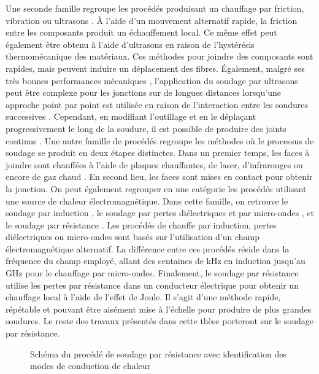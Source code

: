 \FloatBarrier
Une seconde famille regroupe les procédés produisant un chauffage par friction, vibration ou ultrasons \cite{Bates2007d}. 
À l'aide d'un mouvement alternatif rapide, la friction entre les composants produit un échauffement local. 
Ce même effet peut également être obtenu à l'aide d'ultrasons en raison de l'hystérésis thermomécanique des matériaux. 
Ces méthodes pour joindre des composants sont rapides, mais peuvent induire un déplacement des fibres. 
Également, malgré ses très bonnes performances mécaniques \cite{Villegas2016}, l'application du soudage par ultrasons peut être complexe pour les jonctions sur de longues distances lorsqu'une approche point par point est utilisée en raison de l'interaction entre les soudures successives \cite{Zhao2018}. 
Cependant, en modifiant l'outillage et en le déplaçant progressivement le long de la soudure, il est possible de produire des joints continus \cite{Engelschall2019}.
Une autre famille de procédés regroupe les méthodes où le processus de soudage se produit en deux étapes distinctes. 
Dans un premier temps, les faces à joindre sont chauffées à l'aide de plaques chauffantes, de laser, d'infrarouges ou encore de gaz chaud \cite{Yousefpour2004a,Johnson1989}. 
En second lieu, les faces sont mises en contact pour obtenir la jonction. 
On peut également regrouper en une catégorie les procédés utilisant une source de chaleur électromagnétique. 
Dans cette famille, on retrouve le soudage par induction \cite{Rudolf2000a,Ahmed2006a,Farahani2018}, le soudage  par pertes diélectriques et par micro-ondes \cite{Wu2012,Bowler2006a,Menendez2010d}, et le soudage par résistance \cite{houghton1984bonding,Eveno1988,Taylor1991,McKnight1997}. 
Les procédés de chauffe par induction, pertes diélectriques ou micro-ondes sont basés sur l'utilisation d'un champ électromagnétique alternatif. 
La différence entre ces procédés réside dans la fréquence du champ employé, allant des centaines de \si{\kilo\hertz} en induction jusqu'au \si{\giga\hertz} pour le chauffage par micro-ondes. 
Finalement, le soudage par résistance utilise les pertes par résistance dans un conducteur électrique pour obtenir un chauffage local à l'aide de l'effet de Joule. 
Il s'agit d'une méthode rapide, répétable et pouvant être aisément mise à l'échelle pour produire de plus grandes soudures. 
Le reste des travaux présentés dans cette thèse porteront sur le soudage par résistance. 

\begin{figure}[h]
	\centering
	
	\caption{Schéma du procédé de soudage par résistance avec identification des modes de conduction de chaleur}
	\label{fig:schema_soudage_resistance}
\end{figure}

